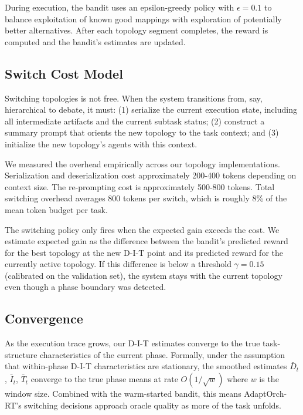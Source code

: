 During execution, the bandit uses an epsilon-greedy policy with
\(\epsilon = 0.1\) to balance exploitation of known good mappings with
exploration of potentially better alternatives. After each topology
segment completes, the reward is computed and the bandit's estimates are
updated.

\subsection{Switch Cost Model}\label{switch-cost-model}

Switching topologies is not free. When the system transitions from, say,
hierarchical to debate, it must: (1) serialize the current execution
state, including all intermediate artifacts and the current subtask
status; (2) construct a summary prompt that orients the new topology to
the task context; and (3) initialize the new topology's agents with this
context.

We measured the overhead empirically across our topology
implementations. Serialization and deserialization cost approximately
200-400 tokens depending on context size. The re-prompting cost is
approximately 500-800 tokens. Total switching overhead averages 800
tokens per switch, which is roughly 8\% of the mean token budget per
task.

The switching policy only fires when the expected gain exceeds the cost.
We estimate expected gain as the difference between the bandit's
predicted reward for the best topology at the new D-I-T point and its
predicted reward for the currently active topology. If this difference
is below a threshold \(\gamma = 0.15\) (calibrated on the validation
set), the system stays with the current topology even though a phase
boundary was detected.

\subsection{Convergence}\label{convergence}

As the execution trace grows, our D-I-T estimates converge to the true
task-structure characteristics of the current phase. Formally, under the
assumption that within-phase D-I-T characteristics are stationary, the
smoothed estimates \(\bar{D}_t\), \(\bar{I}_t\), \(\bar{T}_t\) converge
to the true phase means at rate \(O(1/\sqrt{w})\) where \(w\) is the
window size. Combined with the warm-started bandit, this means
AdaptOrch-RT's switching decisions approach oracle quality as more of
the task unfolds.

